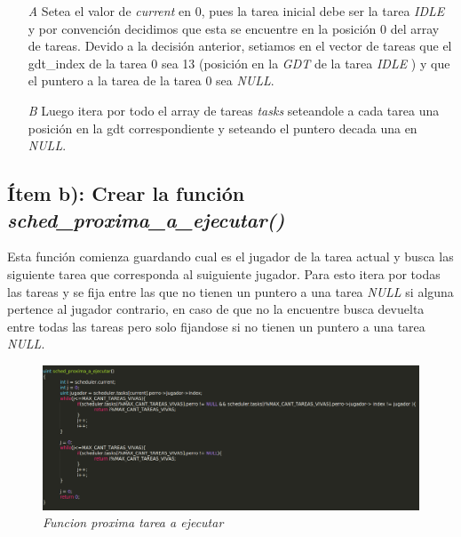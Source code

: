 \begin{itemize}

\item [\textit{A}] Setea el valor de \textit{current} en 0, pues la tarea inicial debe ser la tarea \textit{IDLE} y por convención decidimos que esta se encuentre en la posición 0 del array de tareas. Devido a la decisión anterior, setiamos en el vector de tareas que el gdt\_index de la tarea 0 sea 13 (posición en la \textit{GDT} de la tarea \textit{IDLE} ) y que el puntero a la tarea de la tarea 0 sea \textit{NULL}.

\item [\textit{B}] Luego itera por todo el array de tareas \textit{tasks} seteandole a cada tarea una posición en la gdt correspondiente y seteando el puntero decada una en \textit{NULL}.

\end{itemize}

\subsection{Ítem b):  Crear la función  \textit{sched\_proxima\_a\_ejecutar()}}

Esta función comienza guardando cual es el jugador de la tarea actual y busca las siguiente tarea que corresponda al suiguiente jugador. Para esto itera por todas las tareas y se fija entre las que no tienen un puntero a una tarea \textit{NULL} si alguna pertence al jugador contrario, en caso de que no la encuentre busca devuelta entre todas las tareas pero solo fijandose si no tienen un puntero a una tarea  \textit{NULL}.

\begin{figure}[H]
\begin{center}
\includegraphics[width=\linewidth]{ejercicio7/proxeje.png}
\caption{{\small \textit{Funcion proxima tarea a ejecutar }}}
\endminipage
\end{center}
\end{figure}

